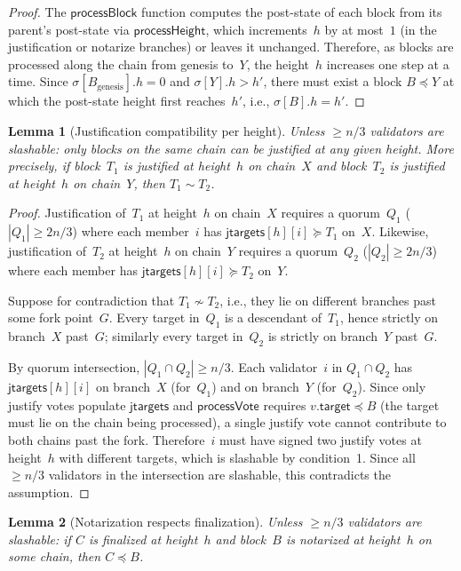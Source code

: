 \ifx\litemode\undefined\documentclass{article}\fi
\newcommand{\target}{\mathsf{target}}
\newcommand{\jtargets}{\mathsf{jtargets}}
\theoremstyle{plain}
\newtheorem{lemma}{Lemma}
\theoremstyle{definition}
\theoremstyle{remark}
\begin{document}
\begin{proof}
The $\textsf{processBlock}$ function computes the post-state of each block from its parent's post-state via $\textsf{processHeight}$, which increments~$h$ by at most~$1$ (in the justification or notarize branches) or leaves it unchanged.
Therefore, as blocks are processed along the chain from genesis to~$Y$, the height~$h$ increases one step at a time.
Since $\sigma[B_\mathrm{genesis}].h = 0$ and $\sigma[Y].h > h'$, there must exist a block $B \preceq Y$ at which the post-state height first reaches~$h'$, i.e., $\sigma[B].h = h'$.
\end{proof}

\begin{lemma}[Justification compatibility per height]\label{lem:uniqueness}
Unless $\geq n/3$ validators are slashable: only blocks on the same chain can be justified at any given height.
More precisely, if block~$T_1$ is justified at height~$h$ on chain~$X$ and block~$T_2$ is justified at height~$h$ on chain~$Y$, then $T_1 \sim T_2$.
\end{lemma}

\begin{proof}
Justification of~$T_1$ at height~$h$ on chain~$X$ requires a quorum~$Q_1$ ($|Q_1| \geq 2n/3$) where each member~$i$ has $\jtargets[h][i] \succeq T_1$ on~$X$.
Likewise, justification of~$T_2$ at height~$h$ on chain~$Y$ requires a quorum~$Q_2$ ($|Q_2| \geq 2n/3$) where each member has $\jtargets[h][i] \succeq T_2$ on~$Y$.

Suppose for contradiction that $T_1 \not\sim T_2$, i.e., they lie on different branches past some fork point~$G$.
Every target in~$Q_1$ is a descendant of~$T_1$, hence strictly on branch~$X$ past~$G$; similarly every target in~$Q_2$ is strictly on branch~$Y$ past~$G$.

By quorum intersection, $|Q_1 \cap Q_2| \geq n/3$.
Each validator~$i$ in $Q_1 \cap Q_2$ has $\jtargets[h][i]$ on branch~$X$ (for~$Q_1$) and on branch~$Y$ (for~$Q_2$).
Since only justify votes populate $\jtargets$ and $\textsf{processVote}$ requires $v.\target \preceq B$ (the target must lie on the chain being processed), a single justify vote cannot contribute to both chains past the fork.
Therefore~$i$ must have signed two justify votes at height~$h$ with different targets, which is slashable by condition~1.
Since all $\geq n/3$ validators in the intersection are slashable, this contradicts the assumption.
\end{proof}

\begin{lemma}[Notarization respects finalization]\label{lem:finexclude}
Unless $\geq n/3$ validators are slashable: if $C$ is finalized at height~$h$ and block~$B$ is notarized at height~$h$ on some chain, then $C \preceq B$.
\end{lemma}
\end{document}
